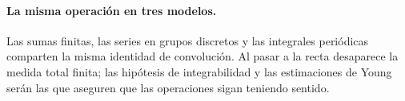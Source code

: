 \paragraph{La misma operación en tres modelos.}
Las sumas finitas, las series en grupos discretos y las integrales periódicas comparten la misma identidad de convolución. Al pasar a la recta desaparece la medida total finita; las hipótesis de integrabilidad y las estimaciones de Young serán las que aseguren que las operaciones sigan teniendo sentido.
